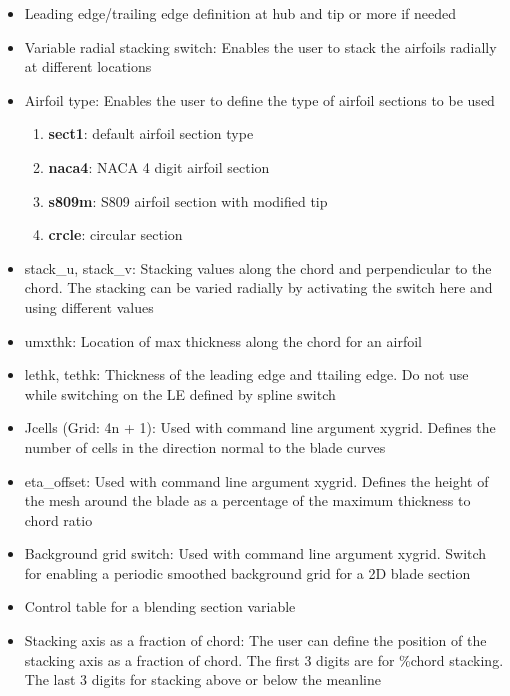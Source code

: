 \documentclass[8pt]{article}
\begin{document}
\begin{itemize}[leftmargin=*]
\begin{enumerate}[label=\alph*]
    \end{enumerate}
    \item Leading edge/trailing edge definition at hub and tip or more if needed
    \item Variable radial stacking switch: Enables the user to stack the airfoils radially at different locations
    \item Airfoil type: Enables the user to define the type of airfoil sections to be used
    \begin{enumerate}[label=\alph*]
        \item \textbf{sect1}: default airfoil section type
        \item \textbf{naca4}: NACA 4 digit airfoil section
        \item \textbf{s809m}: S809 airfoil section with modified tip
        \item \textbf{crcle}: circular section
    \end{enumerate}
    \item stack\_u, stack\_v: Stacking values along the chord and perpendicular to the chord. The stacking can be varied radially by activating the switch here and using different values
    \item umxthk: Location of max thickness along the chord for an airfoil
    \item lethk, tethk: Thickness of the leading edge and ttailing edge. Do not use while switching on the LE defined by spline switch
    \item Jcells (Grid: 4n + 1): Used with command line argument {\selectfont xygrid}. Defines the number of cells in the direction normal to the blade curves
    \item eta\_offset: Used with command line argument {\selectfont xygrid}. Defines the height of the mesh around the blade as a percentage of the maximum thickness to chord ratio
    \item Background grid switch: Used with command line argument {\selectfont xygrid}. Switch for enabling a periodic smoothed background grid for a 2D blade section
    \item Control table for a blending section variable
    \item Stacking axis as a fraction of chord: The user can define the position of the stacking axis as a fraction of chord. The first 3 digits are for \%chord stacking. The last 3 digits for stacking above or below the meanline
    \begin{enumerate}[label=\alph*]

\end{enumerate}
\end{itemize}
\end{document}
